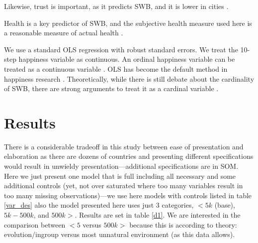 \documentclass[10pt, letterpaper]{article}
\begin{document}
Likewise, trust is important, as it predicts SWB, and it is lower in cities
 \citep{milgram70}.

Health is a key predictor of SWB, and the subjective health measure used here is a reasonable measure of actual health \citep{subramanian09b}.

We use a standard OLS regression with robust standard errors.  We treat the 10-step
happiness variable as continuous. An ordinal happiness variable can be treated as a
continuous variable \citep{carbonell04}.
%
OLS has become the default method in happiness research
\citep{blanchflower11}. Theoretically, while there is still debate about the
cardinality of SWB, there are strong arguments to treat it as a cardinal
variable \citep{ng96,ng97}. 








\section*{Results}

%
There is a considerable tradeoff in this study between ease of presentation and
elaboration as there are dozens of countries and presenting different
specifications would result in unwieldy presentation---additional specifications
are in SOM. Here we just present one model that is full including all necessary
and some additional controls (yet, not over saturated where too many variables
result in too many missing observations)---we use here models with controls listed in table
\ref{var_des} 
also the model presented here uses just 3 categories, $<5k$ (base), $5k-500k$, and $500k>$. Results are set in table \ref{d1}. We are interested in the comparison between $<5$ versus $500k>$ because this is according to theory: evolution/ingroup versus most unnatural environment (as this data allows).
\end{document}
